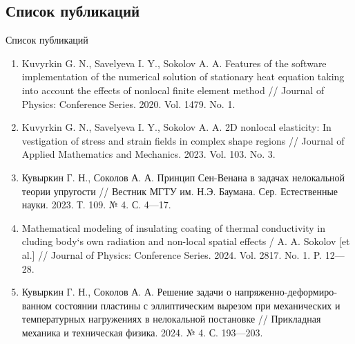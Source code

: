 \subsection{Список публикаций}
\begin{frame}{Список публикаций}
	\small
    \begin{enumerate}
    \justifying
        \item Kuvyrkin G. N., Savelyeva I. Y., Sokolov A. A. Features of the software implementation of the numerical solution of stationary heat equation taking into account the effects of nonlocal finite element method // Journal of Physics: Conference Series. 2020. Vol. 1479. No. 1.

        \item Kuvyrkin G. N., Savelyeva I. Y., Sokolov A. A. 2D nonlocal elasticity: In vestigation of stress and strain fields in complex shape regions // Journal of Applied Mathematics and Mechanics. 2023. Vol. 103. No. 3.

        \item Кувыркин Г. Н., Соколов А. А. Принцип Сен-Венана в задачах нело­кальной теории упругости // Вестник МГТУ им. Н.Э. Баумана. Сер. Естественные науки. 2023. Т. 109. № 4. С. 4—17.

        \item Mathematical modeling of insulating coating of thermal conductivity in cluding body`s own radiation and non-local spatial effects / A. A. Sokolov [et al.] // Journal of Physics: Conference Series. 2024. Vol. 2817. No. 1. P. 12—28.

        \item Кувыркин Г. Н., Соколов А. А. Решение задачи о напряженно-дефо\-рмиро­ванном состоянии пластины с эллиптическим вырезом при механических и температурных нагружениях в нелокальной постановке // Прикладная механика и техническая физика. 2024. № 4. С. 193—203.
	\end{enumerate}
\end{frame}


